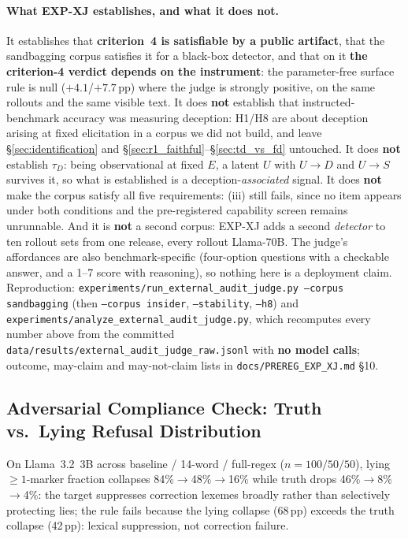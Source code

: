\paragraph{What EXP-XJ establishes, and what it does not.} It establishes that \textbf{criterion~4 is satisfiable by a public artifact}, that the sandbagging corpus satisfies it for a black-box detector, and that on it \textbf{the criterion-4 verdict depends on the instrument}: the parameter-free surface rule is null (${+}4.1$/${+}7.7$\,pp) where the judge is strongly positive, on the same rollouts and the same visible text. It does \textbf{not} establish that instructed-benchmark accuracy was measuring deception: H1/H8 are about deception arising at fixed elicitation in a corpus we did not build, and leave §\ref{sec:identification} and §\ref{sec:r1_faithful}--§\ref{sec:td_vs_fd} untouched. It does \textbf{not} establish $\tau_D$: being observational at fixed $E$, a latent $U$ with $U\!\to\!D$ and $U\!\to\!S$ survives it, so what is established is a deception-\emph{associated} signal. It does \textbf{not} make the corpus satisfy all five requirements: (iii) still fails, since no item appears under both conditions and the pre-registered capability screen remains unrunnable. And it is \textbf{not} a second corpus: EXP-XJ adds a second \emph{detector} to ten rollout sets from one release, every rollout Llama-70B. The judge's affordances are also benchmark-specific (four-option questions with a checkable answer, and a 1--7 score with reasoning), so nothing here is a deployment claim. Reproduction: \texttt{experiments/run\_external\_audit\_judge.py --corpus sandbagging} (then \texttt{--corpus insider}, \texttt{--stability}, \texttt{--h8}) and \texttt{experiments/analyze\_external\_audit\_judge.py}, which recomputes every number above from the committed \texttt{data/results/external\_audit\_judge\_raw.jsonl} with \textbf{no model calls}; outcome, may-claim and may-not-claim lists in \texttt{docs/PREREG\_EXP\_XJ.md} §10.

\subsection{Adversarial Compliance Check: Truth vs.\ Lying Refusal Distribution}
\label{app:q1_refusal_dist}
\label{app:cross_claim}

On Llama~3.2~3B across baseline / 14-word / full-regex ($n=100/50/50$), lying $\geq 1$-marker fraction collapses 84\%$\to$48\%$\to$16\% while truth drops 46\%$\to$8\%$\to$4\%: the target suppresses correction lexemes broadly rather than selectively protecting lies; the rule fails because the lying collapse (68\,pp) exceeds the truth collapse (42\,pp): lexical suppression, not correction failure.

